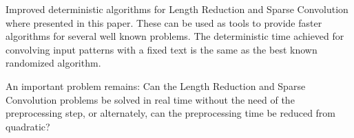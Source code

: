 \documentclass[11pt,amssymb]{article}
\begin{document}
Improved deterministic algorithms for Length Reduction and Sparse
Convolution where presented in this paper. These can be used as
tools to provide faster algorithms for several well known problems.
The deterministic time achieved for convolving input patterns with a
fixed text is the same as the best known randomized algorithm.

An important problem remains: Can the Length Reduction and Sparse
Convolution problems be solved in real time without the need of the
preprocessing step, or alternately, can the preprocessing time be
reduced from quadratic?


\small{

}
\end{document}

